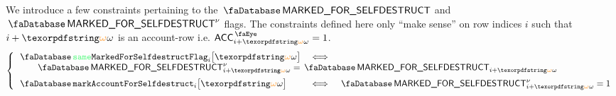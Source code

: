 We introduce a few constraints pertaining to the $\accMarkedForSelfdestruct$ and $\accMarkedForSelfdestruct\new$ flags.
The constraints defined here only ``make sense'' on row indices $i$ such that $i + \relof$ is an account-row i.e.
$\peekAccount_{i + \relof} = 1$.
\[
	\left\{ \begin{array}{lcl}
		\accSameMarkedForSelfdestructFlag   {i}{\relof} & \iff \\
		\multicolumn{3}{l}{
			\qquad \accMarkedForSelfdestruct\new _{i + \relof}
			=
			\accMarkedForSelfdestruct _{i + \relof}
		}
		\vspace{2mm} \\
		\accTurnOnMarkedForSelfdestructFlag {i}{\relof} & \iff & \accMarkedForSelfdestruct\new _{i + \relof} = 1            \\
	\end{array} \right.
\]
